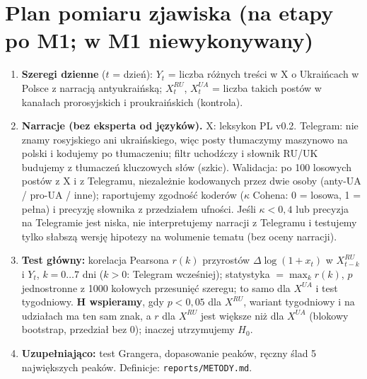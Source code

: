 \documentclass[10pt,a4paper]{article}
\begin{document}
\section{Plan pomiaru zjawiska (na etapy po M1; w M1 niewykonywany)}
\begin{enumerate}[label=\arabic*.]
\item \textbf{Szeregi dzienne} ($t$ = dzień): $Y_t$ = liczba różnych treści w X o Ukraińcach w Polsce z narracją antyukraińską; $X^{RU}_t$, $X^{UA}_t$ = liczba takich postów w kanałach
prorosyjskich i proukraińskich (kontrola).
\item \textbf{Narracje (bez eksperta od języków).} X: leksykon PL v0.2. Telegram: nie znamy rosyjskiego ani ukraińskiego, więc posty tłumaczymy maszynowo na polski i kodujemy po tłumaczeniu;
filtr uchodźczy i słownik RU/UK budujemy z tłumaczeń kluczowych słów (szkic). Walidacja: po 100 losowych postów z X i z Telegramu, niezależnie kodowanych przez dwie osoby (anty-UA / pro-UA / inne);
raportujemy zgodność koderów ($\kappa$ Cohena: 0 = losowa, 1 = pełna) i precyzję słownika z przedziałem ufności. Jeśli $\kappa<0{,}4$ lub precyzja na Telegramie jest niska,
nie interpretujemy narracji z Telegramu i testujemy tylko słabszą wersję hipotezy na wolumenie tematu (bez oceny narracji).
\item \textbf{Test główny:} korelacja Pearsona $r(k)$ przyrostów $\Delta\log(1+x_t)$ w $X^{RU}_{t-k}$ i $Y_t$, $k=0\ldots7$ dni ($k>0$: Telegram wcześniej); statystyka $=\max_k r(k)$,
$p$ jednostronne z 1000 kołowych przesunięć szeregu; to samo dla $X^{UA}$ i test tygodniowy. \textbf{H wspieramy}, gdy $p<0{,}05$ dla $X^{RU}$, wariant tygodniowy i na udziałach ma ten sam znak,
a $r$ dla $X^{RU}$ jest większe niż dla $X^{UA}$ (blokowy bootstrap, przedział bez 0); inaczej utrzymujemy $H_0$.
\item \textbf{Uzupełniająco:} test Grangera, dopasowanie peaków, ręczny ślad 5 największych peaków. Definicje: \texttt{reports/METODY.md}.
\end{enumerate}
\end{document}
